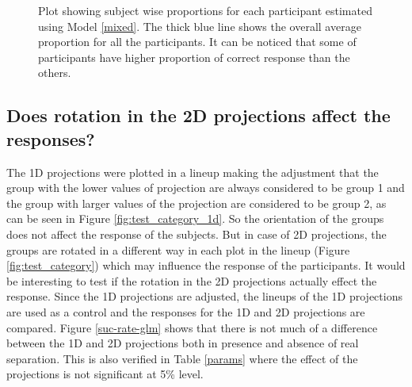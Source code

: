 \documentclass[12]{article}
\begin{document}
\begin{figure}[ht]
   \centering
      \caption{Plot showing subject wise proportions for each participant estimated using Model \ref{mixed}. The thick blue line shows the overall average proportion for all the participants. It can be noticed that some of participants have higher proportion of correct response than the others. }
       \label{subject-glm}
\end{figure}


\subsection{Does rotation in the 2D projections affect the responses?}

The 1D projections were plotted in a lineup making the adjustment that the group with the lower values of projection are always considered to be group 1 and the group with larger values of the projection are considered to be group 2, as can be seen in Figure \ref{fig:test_category_1d}. So the orientation of the groups does not affect the response of the subjects. But in case of 2D projections, the groups are rotated in a different way in each plot in the lineup (Figure \ref{fig:test_category}) which may influence the response of the participants. It would be interesting to test if the rotation in the 2D projections actually effect the response. Since the 1D projections are adjusted, the lineups of the 1D projections are used as a control and the responses for the 1D and 2D projections are compared. Figure \ref{suc-rate-glm} shows that there is not much of a difference between the 1D and 2D projections both in presence and absence of real separation. This is also verified in Table \ref{params} where the effect of the projections is not significant at 5\% level.  
\end{document}
